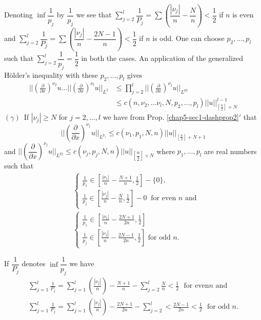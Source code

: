 Denoting $\inf \dfrac{1}{p_j}$ by $\dfrac{1}{p_j}$ we see
that $\sum\limits^l_{j=2} \dfrac{1}{P_j} = \sum \left(\dfrac{| \nu_j|}{n}-
\dfrac{N}{n}\right) < \dfrac{1}{2}$ if $n$ is even and $\sum\limits^l_{j=2}
\dfrac{1}{P_j} = \sum \left(\dfrac{|\nu_j|}{n} - 
\dfrac{2N-1}{n}\right) < \dfrac{1}{2}$ if $n$ is odd. One can choose $p_2,
\ldots , p_l$ such that $\sum\limits^l_{j=2} \dfrac{1}{p_j} =
\dfrac{1}{2}$ in both the cases. An application of the generalized
H\"older's inequality with these $p_2, \ldots, p_l$ gives 
\begin{align*}
|| \left(\frac{\partial}{\partial x}\right)^{\nu_2} u \ldots ||
\left(\frac{\partial}{\partial x}\right)^{\nu_l} u ||_{L^2}  & \leq
\prod\limits^l_{j=2} 
|| \left(\frac{\partial}{\partial x}\right)^{\nu_j} u ||_{L^{pj}} \\ 
&  \leq c(n, \nu_2, \ldots \nu_l, N, p_2, \ldots, p_l) ||
 u||^{l-1}_{\left[\frac{n}{2}\right]+N} 
\end{align*}
$(\gamma)$~\pageoriginale If $| \nu_j| \geq N$ for $j=2, \ldots, l$ we
have from  
Prop. \ref{chap5-sec1-dashprop2}$'$ that 
$$
||\left(\frac{\partial}{\partial x}\right)^{\nu_1} u ||_{L^{p_1}} \leq
c(\nu_1, p_1, N, n) || u ||_{\left[\frac{n}{2} \right] + N + 1} 
$$
and $||\left(\dfrac{\partial}{\partial x}\right)^{\nu_j} u ||_{L^{pj}}
\leq c (\nu_j, p_j, N, n) || u ||_{\left[\dfrac{n}{2} \right]+N}$ 
where $p_1, \ldots , p_l$ are real numbers such that
\begin{align*}
& \begin{cases}
\frac{1}{p_1} \in \left[\frac{|\nu_1|}{n}- \frac{N+1}{n},
  \frac{1}{2} \right] - \{ 0 \}, \\[5pt] 
\frac{1}{p_j} \in \left[\frac{|\nu_j |}{n}- \frac{N}{n},
  \frac{1}{2}\right] - 0~ \text{ for even $n$ and} 
\end{cases}\\
& \begin{cases}
\frac{1}{p_1} \in \left[ \frac{|\nu_1 |}{n}- \frac{2N+1}{2n},
  \frac{1}{2}\right] \\[5pt] 
\frac{1}{p_j} \in \left[ \frac{|\nu_j |}{n}- \frac{2N-1}{2n},
  \frac{1}{2}\right] \text{ for odd $n$}.  
\end{cases}
\end{align*}

If $\dfrac{1}{P_j}$ denotes $\inf \dfrac{1}{p_j}$ we have 
\begin{gather*}
\sum^l_{j=1}\frac{1}{P_j}= \sum^l_{j=1} \left(\frac{| \nu_j |}{n}\right) -
\frac{N+1}{n} - \sum^l_{j=2} \frac{N}{n}< \frac{1}{2} \text{~ for even
$n$ and } \\ 
\sum^l_{j=1}\frac{1}{P_j}= \sum^l_{j=1} \left(\frac{|\nu_j|}{n}\right) -
\frac{2N+1}{2n} - \sum^l_{j=2}< \frac{2N-1}{2n}< \frac{1}{2}
\text{~ for odd $n$}.   
\end{gather*}

